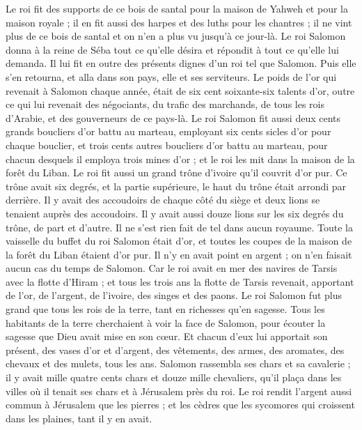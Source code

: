 \begin{multicols}{2}
Le roi fit des supports de ce bois de santal pour la maison de Yahweh et pour la maison royale ; il en fit aussi des harpes et des luths pour les chantres ; il ne vint plus de ce bois de santal et on n'en a plus vu jusqu'à ce jour-là.
Le roi Salomon donna à la reine de Séba tout ce qu'elle désira et répondit à tout ce qu'elle lui demanda. Il lui fit en outre des présents dignes d'un roi tel que Salomon. Puis elle s'en retourna, et alla dans son pays, elle et ses serviteurs.
Le poids de l'or qui revenait à Salomon chaque année, était de six cent soixante-six talents d'or,
outre ce qui lui revenait des négociants, du trafic des marchands, de tous les rois d'Arabie, et des gouverneurs de ce pays-là.
Le roi Salomon fit aussi deux cents grands boucliers d'or battu au marteau, employant six cents sicles d'or pour chaque bouclier,
et trois cents autres boucliers d'or battu au marteau, pour chacun desquels il employa trois mines d'or ; et le roi les mit dans la maison de la forêt du Liban.
Le roi fit aussi un grand trône d'ivoire qu'il couvrit d'or pur.
Ce trône avait six degrés, et la partie supérieure, le haut du trône était arrondi par derrière. Il y avait des accoudoirs de chaque côté du siège et deux lions se tenaient auprès des accoudoirs.
Il y avait aussi douze lions sur les six degrés du trône, de part et d'autre. Il ne s'est rien fait de tel dans aucun royaume.
Toute la vaisselle du buffet du roi Salomon était d'or, et toutes les coupes de la maison de la forêt du Liban étaient d'or pur. Il n'y en avait point en argent ; on n'en faisait aucun cas du temps de Salomon.
Car le roi avait en mer des navires de Tarsis avec la flotte d'Hiram ; et tous les trois ans la flotte de Tarsis revenait, apportant de l'or, de l'argent, de l'ivoire, des singes et des paons.
Le roi Salomon fut plus grand que tous les rois de la terre, tant en richesses qu'en sagesse.
Tous les habitants de la terre cherchaient à voir la face de Salomon, pour écouter la sagesse que Dieu avait mise en son cœur.
Et chacun d'eux lui apportait son présent, des vases d'or et d'argent, des vêtements, des armes, des aromates, des chevaux et des mulets, tous les ans.
Salomon rassembla ses chars et sa cavalerie ; il y avait mille quatre cents chars et douze mille chevaliers, qu'il plaça dans les villes où il tenait ses chars et à Jérusalem près du roi.
Le roi rendit l'argent aussi commun à Jérusalem que les pierres ; et les cèdres que les sycomores qui croissent dans les plaines, tant il y en avait.

\end{multicols}
